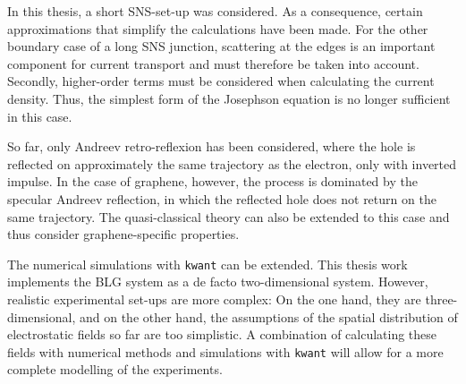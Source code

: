 In this thesis, a short SNS-set-up was considered. As a consequence, certain approximations that simplify the calculations have been made.  For the other boundary case of a long SNS junction, scattering at the edges is an important component for current transport and must therefore be taken into account. Secondly, higher-order terms must be considered when calculating the current density. Thus, the simplest form of the Josephson equation is no longer sufficient in this case. 

So far, only Andreev retro-reflexion has been considered, where the hole is reflected on approximately the same trajectory as the electron, only with inverted impulse. In the case of graphene, however, the process is dominated by the specular Andreev reflection, in which the reflected hole does not return on the same trajectory. The quasi-classical theory can also be extended to this case and thus consider graphene-specific properties.

The numerical simulations with \texttt{kwant} can be extended. This thesis work implements the BLG system as a de facto two-dimensional system. However, realistic experimental set-ups are more complex: On the one hand, they are three-dimensional, and on the other hand, the assumptions of the spatial distribution of electrostatic fields so far are too simplistic. A combination of calculating these fields with numerical methods and simulations with \texttt{kwant} will allow for a more complete modelling of the experiments. 







